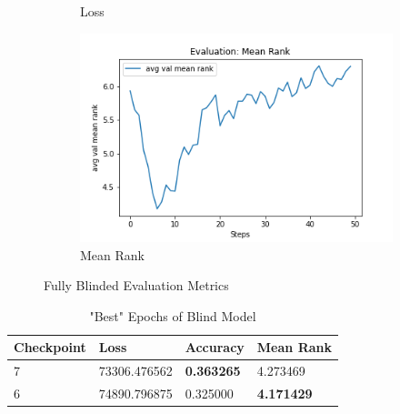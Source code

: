 \begin{figure}[H]
\begin{subfigure}[b]{0.3\textwidth}
         \caption{Loss}
         \label{fig:fb_e_loss}
     \end{subfigure}
     \hfill
     \begin{subfigure}[b]{0.3\textwidth}
         \centering
         \includegraphics[width=\textwidth]{./figure/results/fully_blinded/eval/avg val mean rank.png}
         \caption{Mean Rank}
         \label{fig:fb_e_mean_rank}
     \end{subfigure}
     \caption{Fully Blinded Evaluation Metrics}
     \label{fig:fb_e_metrics}
\end{figure}

\begin{table}[H]
\centering
\caption{"Best" Epochs of Blind Model}
\begin{tabular}{l | l | l | l}
Checkpoint & Loss & Accuracy & Mean Rank \\
\hline
7 & 73306.476562 & \textbf{0.363265} & 4.273469 \\
6 & 74890.796875 & 0.325000 & \textbf{4.171429}
\end{tabular}
\label{tab:best_blind}
\end{table}
